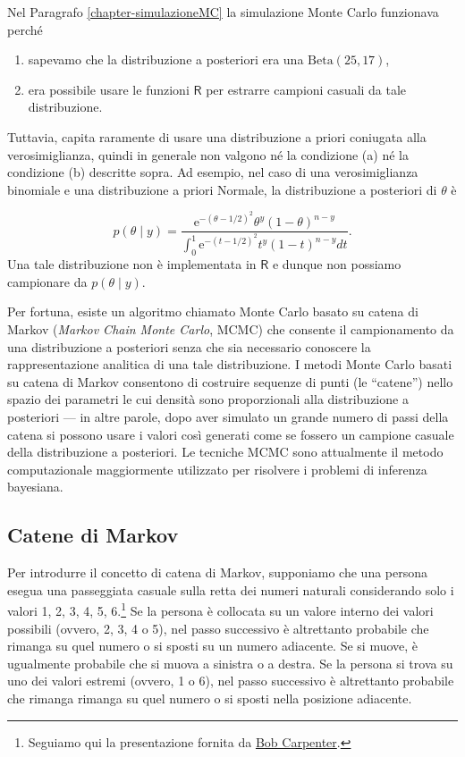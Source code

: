 \documentclass[
]{memoir}
\providecommand{\tightlist}{%
  \setlength{\itemsep}{0pt}\setlength{\parskip}{0pt}}
\newcommand{\R}{\textsf{R}} %
\begin{document}
Nel Paragrafo \ref{chapter-simulazioneMC} la simulazione Monte Carlo funzionava perché

\begin{enumerate}
\def\labelenumi{(\alph{enumi})}
\tightlist
\item
  sapevamo che la distribuzione a posteriori era una \(\mbox{Beta}(25, 17)\),
\item
  era possibile usare le funzioni \(\R\) per estrarre campioni casuali da tale distribuzione.
\end{enumerate}

\noindent
Tuttavia, capita raramente di usare una distribuzione a priori coniugata alla verosimiglianza, quindi in generale non valgono né la condizione (a) né la condizione (b) descritte sopra. Ad esempio, nel caso di una verosimiglianza binomiale e una distribuzione a priori Normale, la distribuzione a posteriori di \(\theta\) è

\[
p(\theta \mid y) = \frac{\mathrm{e}^{-(\theta - 1 / 2)^2} \theta^y (1 - \theta)^{n - y}} {\int_0^1 \mathrm{e}^{-(t - 1 / 2)^2} t^y (1 - t)^{n - y} dt}.
\]
\noindent
Una tale distribuzione non è implementata in \(\R\) e dunque non possiamo campionare da \(p(\theta \mid y)\).

Per fortuna, esiste un algoritmo chiamato Monte Carlo basato su catena di Markov (\emph{Markov Chain Monte Carlo}, MCMC) che consente il campionamento da una distribuzione a posteriori senza che sia necessario conoscere la rappresentazione analitica di una tale distribuzione. I metodi Monte Carlo basati su catena di Markov consentono di costruire sequenze di punti (le ``catene'') nello spazio dei parametri le cui densità sono proporzionali alla distribuzione a posteriori --- in altre parole, dopo aver simulato un grande numero di passi della catena si possono usare i valori così generati come se fossero un campione casuale della distribuzione a posteriori. Le tecniche MCMC sono attualmente il metodo computazionale maggiormente utilizzato per risolvere i problemi di inferenza bayesiana.

\hypertarget{catene-di-markov}{%
\subsection{Catene di Markov}\label{catene-di-markov}}

Per introdurre il concetto di catena di Markov, supponiamo che una persona esegua una passeggiata casuale sulla retta dei numeri naturali considerando solo i valori 1, 2, 3, 4, 5, 6.\footnote{Seguiamo qui la presentazione fornita da \href{https://github.com/bob-carpenter/prob-stats}{Bob Carpenter}.} Se la persona è collocata su un valore interno dei valori possibili (ovvero, 2, 3, 4 o 5), nel passo successivo è altrettanto probabile che rimanga su quel numero o si sposti su un numero adiacente. Se si muove, è ugualmente probabile che si muova a sinistra o a destra. Se la persona si trova su uno dei valori estremi (ovvero, 1 o 6), nel passo successivo è altrettanto probabile che rimanga rimanga su quel numero o si sposti nella posizione adiacente.
\end{document}
